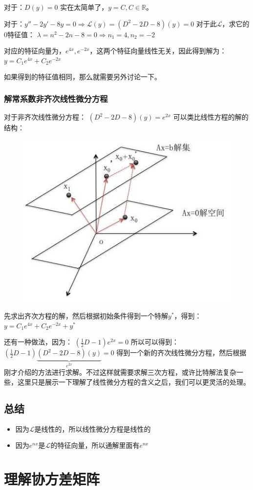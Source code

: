 \documentclass[12pt]{article}
\begin{document}
对于：$D(y)=0$ 实在太简单了，$y=C,C\in\mathbb{R}$。

对于：$y''-2y'-8y=0 \Rightarrow \mathcal{L}(y)=(D^2-2D-8)(y)=0$
对于此$\mathcal{L}$，求它的0特征值：
$\lambda=n^2-2n-8=0\Rightarrow n_1=4,n_2=-2$

对应的特征向量为，$e^{4x},e^{-2x}$，这两个特征向量线性无关，因此得到解为：
$y=C_1e^{4x}+C_2e^{-2x}$

如果得到的特征值相同，那么就需要另外讨论一下。

\subsubsection{解常系数非齐次线性微分方程}
对于非齐次线性微分方程：
$(D^2-2D-8)(y)=e^{2x}$
可以类比线性方程的解的结构：
\begin{figure}[H]
    \centering
    \includegraphics[width=.5\textwidth]{fig/UnderstandLinearDifferentialEquation_2.jpeg}
\end{figure} 

先求出齐次方程的解，然后根据初始条件得到一个特解$y^*$，得到：
$y=C_1e^{4x}+C_2e^{-2x}+y^*$

还有一种做法，因为：
$(\frac{1}{2}D-1)e^{2x}=0$
所以可以得到：
$(\frac{1}{2}D-1)\underbrace{(D^2-2D-8)(y)}_{e^{2x}}=0$
得到一个新的齐次线性微分方程，然后根据刚才介绍的方法进行求解。不过这样就需要求解三次方程，或许比特解法复杂一些，这里只是展示一下理解了线性微分方程的含义之后，我们可以更灵活的处理。

\subsection{总结}
\begin{itemize}
    \item 因为$\mathcal{L}$是线性的，所以线性微分方程是线性的
    \item 因为$e^{nx}$是$\mathcal{L}$的特征向量，所以通解里面有$e^{nx}$
\end{itemize}

\section{理解协方差矩阵\cite{Understand_Covariance_Matrix}}
\end{document}
